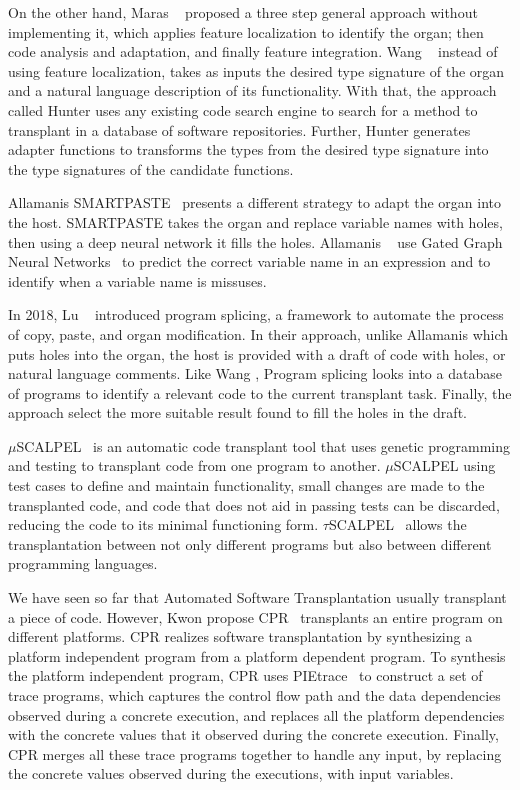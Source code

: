 On the other hand, Maras \etal~\cite{maras2015towards} proposed a three step general approach without implementing it, which applies feature localization to identify the organ; then code analysis and adaptation, and finally feature integration. Wang \etal~\cite{wang2016hunter} instead of using feature localization, takes as inputs the desired type signature of the organ and a natural language description of its functionality. With that, the approach called Hunter uses any existing code search engine to search for a method to transplant in a database of software repositories. Further, Hunter generates adapter functions to transforms the types from the desired type signature into the type signatures of the candidate functions.

Allamanis \etal SMARTPASTE~\cite{allamanis2017smartpaste} presents a different strategy to adapt the organ into the host. SMARTPASTE takes the organ and replace variable names with holes, then using a deep neural network it fills the holes. Allamanis \etal~\cite{allamanis2017smartpaste} use Gated Graph Neural Networks~\cite{li2015gated} to predict the correct variable name in an expression and to identify when a variable name is missuses.

In 2018, Lu \etal~\cite{lu2018program} introduced program splicing, a framework to automate the process of copy, paste, and organ modification. In their approach, unlike Allamanis \etal which puts holes into the organ, the host is provided with a draft of code with holes, or natural language comments. Like Wang \etal, Program splicing looks into a database of programs to identify a relevant code to the current transplant task. Finally, the approach select the more suitable result found to fill the holes in the draft.

$\mu$SCALPEL~\cite{barr2015automated} is an automatic code transplant tool that uses genetic programming and testing to transplant code from one program to another. $\mu$SCALPEL using test cases to define and maintain functionality, small changes are made to the transplanted code, and code that does not aid in passing tests can be discarded, reducing the code to its minimal functioning form. $\tau$SCALPEL~\cite{marginean2021automated} allows the transplantation between not only different programs but also between different programming languages. 

We have seen so far that Automated Software Transplantation usually transplant a piece of code. However, Kwon \etal propose CPR~\cite{kwon2017cpr} transplants an entire program on different platforms. CPR realizes software transplantation by synthesizing a platform independent program from a platform dependent program. To synthesis the platform independent program, CPR uses PIEtrace~\cite{kwon2013pietrace} to construct a set of trace programs, which captures the control flow path and the data dependencies observed during a concrete execution, and replaces all the platform dependencies with the concrete values that it observed during the concrete execution. Finally, CPR merges all these trace programs together to handle any input, by replacing the concrete values observed during the executions, with input variables. 

